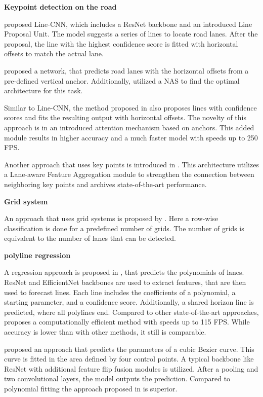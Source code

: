 \textbf{Keypoint detection on the road}

\cite{LineCNN2020} proposed Line-CNN, which includes a ResNet backbone and an introduced Line Proposal Unit.
The model suggests a series of lines to locate road lanes.
After the proposal, the line with the highest confidence score is fitted with horizontal offsets to match the actual lane.

\cite{CurveLaneNAS2020} proposed a network, that predicts road lanes with the horizontal offsets from a pre-defined vertical anchor.
Additionally, \cite{CurveLaneNAS2020} utilized a \ac{NAS} to find the optimal architecture for this task.

Similar to Line-CNN, the method proposed in \cite{KeepEyesOnLane2021} also proposes lines with confidence scores and fits the resulting output with horizontal offsets.
The novelty of this approach is in an introduced attention mechanism based on anchors.
This added module results in higher accuracy and a much faster model with speeds up to 250 \ac{FPS}.

Another approach that uses key points is introduced in \cite{GANet2022}.
This architecture utilizes a Lane-aware Feature Aggregation module to strengthen the connection between neighboring key points and archives state-of-the-art performance.

\textbf{Grid system}

An approach that uses grid systems is proposed by \cite{laneDetectionGrid2020}.
Here a row-wise classification is done for a predefined number of grids.
The number of grids is equivalent to the number of lanes that can be detected.

\textbf{polyline regression}

A regression approach is proposed in \cite{PolyLaneNetRoad2021}, that predicts the polynomials of lanes.
ResNet and EfficientNet backbones are used to extract features, that are then used to forecast lines.
Each line includes the coefficients of a polynomial, a starting parameter, and a confidence score.
Additionally, a shared horizon line is predicted, where all polylines end.
Compared to other state-of-the-art approaches, \cite{PolyLaneNetRoad2021} proposes a computationally efficient method with speeds up to 115 \ac{FPS}.
While accuracy is lower than with other methods, it still is comparable.

\cite{DetectingLanesWithBezierCurves2023} proposed an approach that predicts the parameters of a cubic Bezier curve.
This curve is fitted in the area defined by four control points.
A typical backbone like ResNet with additional feature flip fusion modules is utilized.
After a pooling and two convolutional layers, the model outputs the prediction.
Compared to polynomial fitting the approach proposed in \cite{DetectingLanesWithBezierCurves2023} is superior.

